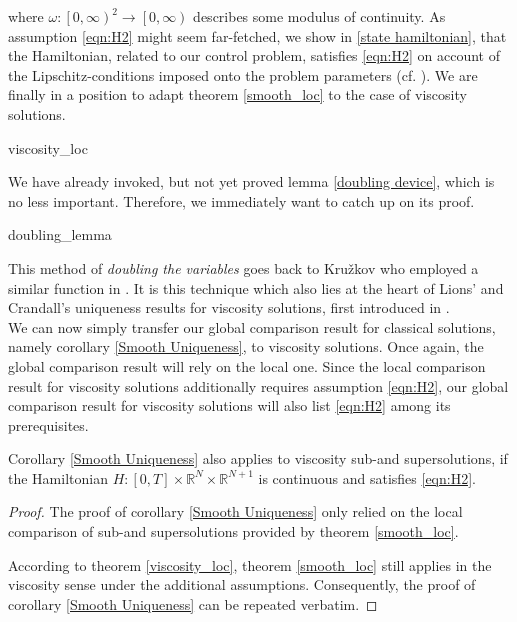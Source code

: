 		 where $ \omega : \left[0, \infty \right)^2 \to \left[0, \infty \right) $ describes some modulus of continuity. As assumption \eqref{eqn:H2} 
		 might seem far-fetched, we show in \ref{state hamiltonian}, that the Hamiltonian, related to our control problem, satisfies \eqref{eqn:H2} on account of the Lipschitz-conditions imposed onto the problem parameters (cf. \cite[p.~167]{zhou}). We are finally in a position to adapt theorem \ref{smooth_loc} to the case of viscosity solutions.
		 
		 {viscosity_loc}
		 
		 We have already invoked, but not yet proved lemma \ref{doubling device}, which is no less important. Therefore, we immediately want to catch up on its proof.
		 
		 {doubling_lemma}
		 
		 This method of \emph{doubling the variables} goes back to Kru\v{z}kov who employed a similar function in \cite{kruvzkov}. It is this technique which also lies at the heart of Lions' and Crandall's uniqueness results for viscosity solutions, first introduced in \cite{lions}. \\
		 
		 We can now simply transfer our global comparison result for classical solutions, namely corollary \ref{Smooth Uniqueness}, to viscosity solutions. Once again, the global comparison result will rely on the local one. Since the local comparison result for viscosity solutions additionally requires assumption  \eqref{eqn:H2}, our global comparison result for viscosity solutions will also list \eqref{eqn:H2} among its prerequisites.
		  
		  \begin{corollary}
		  	Corollary \ref{Smooth Uniqueness} also applies to viscosity sub-and supersolutions, if the Hamiltonian $ H : \left[ 0, T \right] \times \mathbb{R}^{N} \times \mathbb{R}^{N+1} $ is continuous and satisfies \eqref{eqn:H2}.
		  	
		  	\begin{proof}
		  		The proof of corollary \ref{Smooth Uniqueness} only relied on the local comparison of sub-and supersolutions provided by theorem \ref{smooth_loc}. 
		  		
		  		According to theorem \ref{viscosity_loc}, theorem \ref{smooth_loc} still applies in the viscosity sense under the additional assumptions. Consequently, the proof of corollary \ref{Smooth Uniqueness} can be repeated verbatim.
		  	\end{proof}
		  \end{corollary}
		  